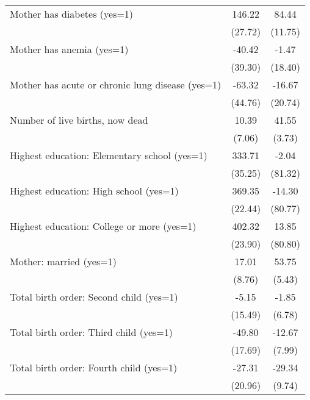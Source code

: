 \begin{tabular}{l*{2}{c}}
Mother has diabetes (yes=1)                       &      146.22&       84.44\\
                                                  &     (27.72)&     (11.75)\\
Mother has anemia (yes=1)                         &      -40.42&       -1.47\\
                                                  &     (39.30)&     (18.40)\\
Mother has acute or chronic lung disease (yes=1)  &      -63.32&      -16.67\\
                                                  &     (44.76)&     (20.74)\\
Number of live births, now dead                   &       10.39&       41.55\\
                                                  &      (7.06)&      (3.73)\\
Highest education: Elementary school (yes=1)      &      333.71&       -2.04\\
                                                  &     (35.25)&     (81.32)\\
Highest education: High school (yes=1)            &      369.35&      -14.30\\
                                                  &     (22.44)&     (80.77)\\
Highest education: College or more (yes=1)        &      402.32&       13.85\\
                                                  &     (23.90)&     (80.80)\\
Mother: married (yes=1)                           &       17.01&       53.75\\
                                                  &      (8.76)&      (5.43)\\
Total birth order: Second child (yes=1)           &       -5.15&       -1.85\\
                                                  &     (15.49)&      (6.78)\\
Total birth order: Third child (yes=1)            &      -49.80&      -12.67\\
                                                  &     (17.69)&      (7.99)\\
Total birth order: Fourth child (yes=1)           &      -27.31&      -29.34\\
                                                  &     (20.96)&      (9.74)\\

\end{tabular}
